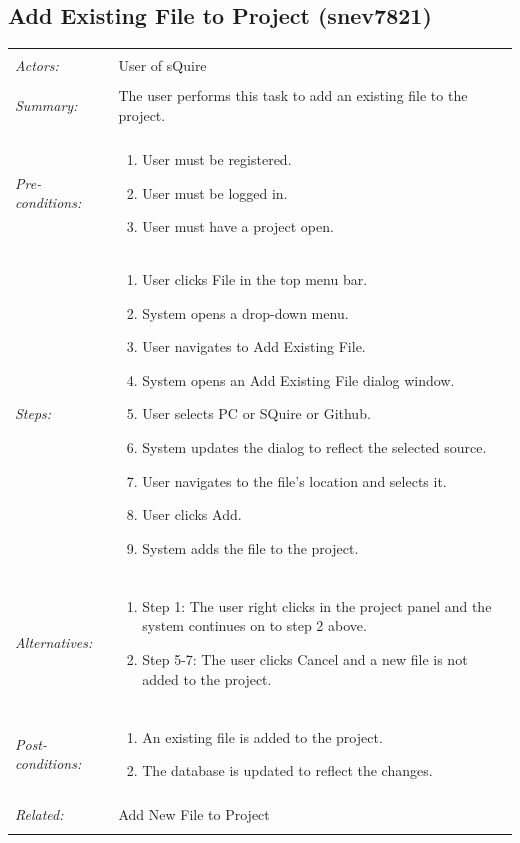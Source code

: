 \documentclass[11pt]{report}
\begin{document}
\subsection{Add Existing File to Project (snev7821)}
\begin{tabular}{ p{2cm} p{12cm} }
\hline
 \\
 \textit{Actors:} & User of sQuire \\
	\\
	\textit{Summary:} & The user performs this task to add an existing file to the project. \\ 
	\\
	\textit{Pre-conditions:} & \begin{enumerate}
		\item User must be registered.
		\item User must be logged in.
		\item User must have a project open.
	\end{enumerate} \\
	\textit{Steps:} & \begin{enumerate}
		\item User clicks File in the top menu bar.
		\item System opens a drop-down menu.
		\item User navigates to Add Existing File.
		\item System opens an Add Existing File dialog window.
		\item User selects PC or SQuire or Github.
		\item System updates the dialog to reflect the selected source.
		\item User navigates to the file's location and selects it.
		\item User clicks Add.
		\item System adds the file to the project.
	\end{enumerate} \\
	\\
	\textit{Alternatives:} & \begin{enumerate}
		\item Step 1: The user right clicks in the project panel and the system continues on to step 2 above.
		\item Step 5-7: The user clicks Cancel and a new file is not added to the project.
	\end{enumerate} \\
	\\
	\textit{Post-conditions:} & \begin{enumerate}
		\item An existing file is added to the project.
		\item The database is updated to reflect the changes.
	\end{enumerate} \\
	\\
	\textit{Related:} & Add New File to Project \\
	\\
	\hline
\end{tabular}
\newpage
\end{document}
